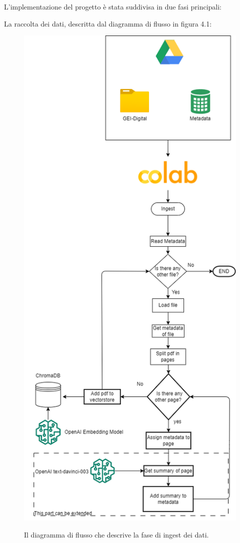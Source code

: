L'implementazione del progetto è stata suddivisa in due fasi principali:

La raccolta dei dati, descritta dal diagramma di flusso in figura 4.1:
\begin{figure}[H]
    \centering
    \includegraphics[height=0.5\pdfpageheight]{images/ingest.png}\label{fig:ingest}
    \caption[Ingestion]{Il diagramma di flusso che descrive la fase di ingest dei dati.}
\end{figure}

